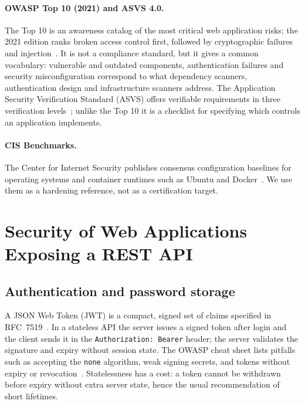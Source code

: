 \paragraph{OWASP Top 10 (2021) and ASVS 4.0.} The Top 10 is an awareness catalog of the most critical web application risks; the 2021 edition ranks broken access control first, followed by cryptographic failures and injection~\cite{owasp-top10}. It is not a compliance standard, but it gives a common vocabulary: vulnerable and outdated components, authentication failures and security misconfiguration correspond to what dependency scanners, authentication design and infrastructure scanners address. The Application Security Verification Standard (ASVS) offers verifiable requirements in three verification levels~\cite{owasp-asvs}; unlike the Top 10 it is a checklist for specifying which controls an application implements.

\paragraph{CIS Benchmarks.} The Center for Internet Security publishes consensus configuration baselines for operating systems and container runtimes such as Ubuntu and Docker~\cite{cis-benchmarks}. We use them as a hardening reference, not as a certification target.

\section{Security of Web Applications Exposing a REST API}
\label{sec:webappsec}

\subsection{Authentication and password storage}

A JSON Web Token (JWT) is a compact, signed set of claims specified in RFC~7519~\cite{rfc7519}. In a stateless API the server issues a signed token after login and the client sends it in the \texttt{Authorization: Bearer} header; the server validates the signature and expiry without session state. The OWASP cheat sheet lists pitfalls such as accepting the \texttt{none} algorithm, weak signing secrets, and tokens without expiry or revocation~\cite{owasp-jwt-cheatsheet}. Statelessness has a cost: a token cannot be withdrawn before expiry without extra server state, hence the usual recommendation of short lifetimes.

